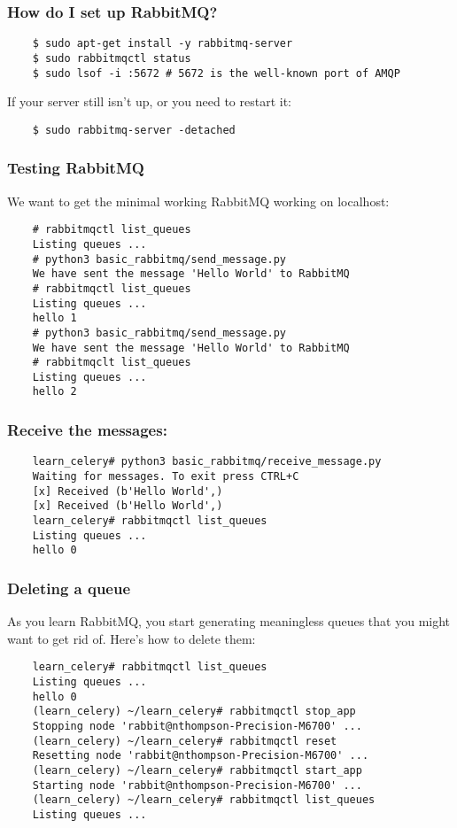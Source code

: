 \documentclass[9pt]{beamer}
\begin{document}
\begin{frame}[fragile]
  \frametitle{How do I set up RabbitMQ?}
  \begin{verbatim}
    $ sudo apt-get install -y rabbitmq-server
    $ sudo rabbitmqctl status
    $ sudo lsof -i :5672 # 5672 is the well-known port of AMQP
  \end{verbatim}
  If your server still isn't up, or you need to restart it:
  \begin{verbatim}
    $ sudo rabbitmq-server -detached 
  \end{verbatim}
\end{frame}

\begin{frame}[fragile]
  \frametitle{Testing RabbitMQ}
  We want to get the minimal working RabbitMQ working on localhost:
  \begin{verbatim}
    # rabbitmqctl list_queues
    Listing queues ...
    # python3 basic_rabbitmq/send_message.py
    We have sent the message 'Hello World' to RabbitMQ
    # rabbitmqctl list_queues
    Listing queues ...
    hello 1
    # python3 basic_rabbitmq/send_message.py
    We have sent the message 'Hello World' to RabbitMQ
    # rabbitmqclt list_queues
    Listing queues ...
    hello 2
  \end{verbatim}
\end{frame}

\begin{frame}[fragile]
  \frametitle{Receive the messages:}
  \begin{verbatim}
    learn_celery# python3 basic_rabbitmq/receive_message.py
    Waiting for messages. To exit press CTRL+C
    [x] Received (b'Hello World',)
    [x] Received (b'Hello World',)
    learn_celery# rabbitmqctl list_queues
    Listing queues ...
    hello 0
  \end{verbatim}
\end{frame}

\begin{frame}[fragile]
  \frametitle{Deleting a queue}
  As you learn RabbitMQ, you start generating meaningless queues that you might want to get rid of. Here's how to delete them:
  \begin{verbatim}
    learn_celery# rabbitmqctl list_queues
    Listing queues ...
    hello 0
    (learn_celery) ~/learn_celery# rabbitmqctl stop_app
    Stopping node 'rabbit@nthompson-Precision-M6700' ...
    (learn_celery) ~/learn_celery# rabbitmqctl reset
    Resetting node 'rabbit@nthompson-Precision-M6700' ...
    (learn_celery) ~/learn_celery# rabbitmqctl start_app
    Starting node 'rabbit@nthompson-Precision-M6700' ...
    (learn_celery) ~/learn_celery# rabbitmqctl list_queues
    Listing queues ...
  \end{verbatim}
\end{frame}
\end{document}
